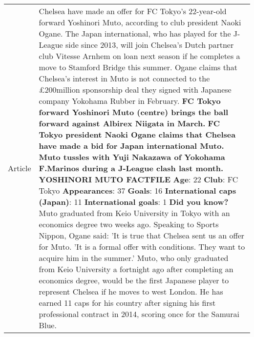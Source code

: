 \begin{table*}[!ht]
\scriptsize
    \centering
    \begin{tabular}{p{55pt}p{365pt}}
    \toprule
    Article & Chelsea have made an offer for FC Tokyo's 22-year-old forward Yoshinori Muto, according to club president Naoki Ogane. \newline
    The Japan international, who has played for the J-League side since 2013, will join Chelsea's Dutch partner club Vitesse Arnhem on loan next season if he completes a move to Stamford Bridge this summer. \newline
    Ogane claims that Chelsea's interest in Muto is not connected to the £200million sponsorship deal they signed with Japanese company Yokohama Rubber in February. \newline
    \textbf{FC Tokyo forward Yoshinori Muto (centre) brings the ball forward against Albirex Niigata in March.}\newline
    \textbf{FC Tokyo president Naoki Ogane claims that Chelsea have made a bid for Japan international Muto.}\newline
    \textbf{Muto tussles with Yuji Nakazawa of Yokohama F.Marinos during a J-League clash last month.}\newline\newline
    \textbf{YOSHINORI MUTO FACTFILE} \newline
    \textbf{Age}: 22 \newline
    \textbf{Club}: FC Tokyo \newline
    \textbf{Appearances}: 37 \newline
    \textbf{Goals}: 16 \newline
    \textbf{International caps (Japan)}: 11 \newline
    \textbf{International goals}: 1 \newline
    \textbf{Did you know?} Muto graduated from Keio University in Tokyo with an economics degree two weeks ago. \newline\newline
    Speaking to Sports Nippon, Ogane said: 'It is true that Chelsea sent us an offer for Muto. 'It is a formal offer with conditions. They want to acquire him in the summer.' \newline
    Muto, who only graduated from Keio University a fortnight ago after completing an economics degree, would be the first Japanese player to represent Chelsea if he moves to west London. He has earned 11 caps for his country after signing his first professional contract in 2014, scoring once for the Samurai Blue. \newline

\end{tabular}
\end{table*}
